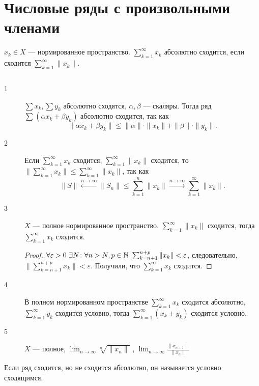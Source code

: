 \section{Числовые ряды с произвольными членами}
\begin{defn}
    $ x_k \in  X$ --- нормированное пространство. $ \sum_{k=1}^{\infty} x_k$ {\sf абсолютно сходится}, если сходится $ \sum_{k=1}^{\infty} \| x_k \| $.
\end{defn}
\begin{prop}

    $ $
    \begin{description}
	\item[1] $ \sum x_k, \sum y_k $ абсолютно сходятся,  $ \alpha , \beta $ --- скаляры. Тогда ряд $ \sum_{}^{} ( \alpha x_k + \beta y_k)$ абсолютно сходится, так как
	    \[
	    \|  \alpha x_k + \beta  y_k \|  \le \| \alpha  \| \cdot \|  x_k \|  + \| \beta  \| \cdot  \|  y_k \| 
	    .\] 
	\item[2] Если $ \sum_{k=1}^{\infty} x_k$ сходится, $ \sum_{k=1}^{\infty} \| x_k \| $ сходится, то $ \| \sum_{k=1}^{\infty}  x_k\| \le \sum_{k=1}^{\infty} \| x_k \| $, так как
	    \[
		\| S \| \stackrel{n \to  \infty}{\longleftarrow} \| S_n \| \le \sum_{k=1}^{n} \|  x_k \|  \stackrel{n \to  \infty}{\longrightarrow} \sum_{k=1}^{\infty} \| x_k \| 
	    .\] 
	\item[3] $ X$ --- полное нормированное пространство. $ \sum_{k=1}^{\infty} \| x_k \|   $ сходится, тогда $ \sum_{k=1}^{\infty} x_k$ сходится.
	    \begin{proof}
		    $ \forall  \varepsilon >0 ~ \exists  N \colon  \forall n > N , p \in  \mathbb{N} ~ \sum_{k = n+1}^{n+p} \| x_k \|  < \varepsilon $, следовательно, $ \| \sum_{k = n+1}^{n+p} x_k \| < \varepsilon $. Получили, что $ \sum_{k=1}^{\infty} x_k$ сходится.
	    \end{proof}
	\item[4] В полном нормированном пространстве $ \sum_{k=1}^{\infty} x_k$ сходится абсолютно, $ \sum_{k=1}^{\infty} y_k$ сходится условно, тогда $ \sum_{k=1}^{\infty} (x_k+ y_k)$ сходится условно.
	\item[5] $ X $ --- полное, $ \overline{\lim}_{n \to  \infty} \sqrt[n]{ \|  x_n \| } $ , $ \lim_{n \to \infty} \frac{\| x_{n+1} \| }{\| x_n \| }$

    \end{description}
\end{prop}
\begin{defn}
    Если ряд сходится, но не сходится абсолютно, он называется {\sf условно сходящимся.}  
\end{defn}
